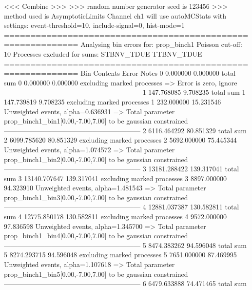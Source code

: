  <<< Combine >>> 
>>> random number generator seed is 123456
>>> method used is AsymptoticLimits
Channel ch1 will use autoMCStats with settings: event-threshold=10, include-signal=0, hist-mode=1
============================================================
Analysing bin errors for: prop_binch1
Poisson cut-off: 10
Processes excluded for sums: STBNV_TDUE TTBNV_TDUE
============================================================
Bin        Contents        Error           Notes                         
0          0.000000        0.000000        total sum                     
0          0.000000        0.000000        excluding marked processes    
  => Error is zero, ignore      
------------------------------------------------------------
1          147.768085      9.708235        total sum                     
1          147.739819      9.708235        excluding marked processes    
1          232.000000      15.231546       Unweighted events, alpha=0.636931
  => Total parameter prop_binch1_bin1[0.00,-7.00,7.00] to be gaussian constrained
------------------------------------------------------------
2          6116.464292     80.851329       total sum                     
2          6099.785620     80.851329       excluding marked processes    
2          5692.000000     75.445344       Unweighted events, alpha=1.074572
  => Total parameter prop_binch1_bin2[0.00,-7.00,7.00] to be gaussian constrained
------------------------------------------------------------
3          13181.288422    139.317041      total sum                     
3          13140.707647    139.317041      excluding marked processes    
3          8897.000000     94.323910       Unweighted events, alpha=1.481543
  => Total parameter prop_binch1_bin3[0.00,-7.00,7.00] to be gaussian constrained
------------------------------------------------------------
4          12881.037387    130.582811      total sum                     
4          12775.850178    130.582811      excluding marked processes    
4          9572.000000     97.836598       Unweighted events, alpha=1.345700
  => Total parameter prop_binch1_bin4[0.00,-7.00,7.00] to be gaussian constrained
------------------------------------------------------------
5          8474.383262     94.596048       total sum                     
5          8274.293715     94.596048       excluding marked processes    
5          7651.000000     87.469995       Unweighted events, alpha=1.107618
  => Total parameter prop_binch1_bin5[0.00,-7.00,7.00] to be gaussian constrained
------------------------------------------------------------
6          6479.633888     74.471465       total sum                     
